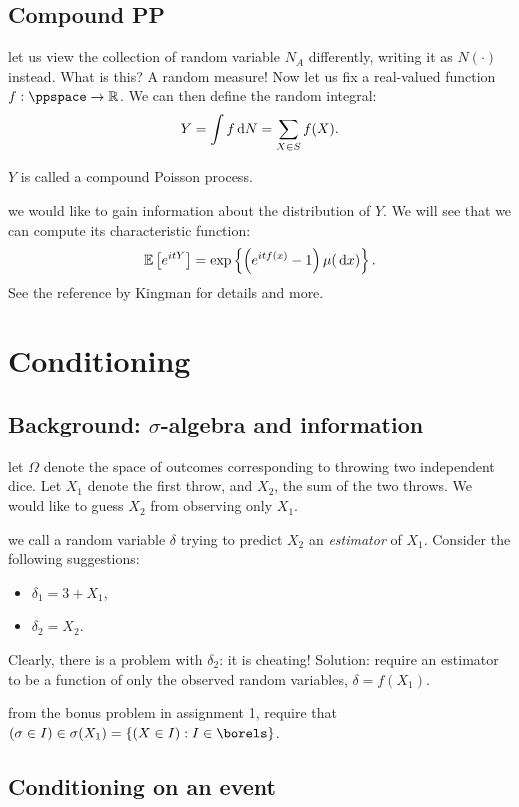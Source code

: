 \documentclass{article}
\begin{document}
\subsection{Compound PP}

 let us view the collection of random variable $N_A$ differently, writing it as $N(\cdot)$ instead. What is this? A random measure! Now let us fix a real-valued function $f : \ppspace \to \R$. We can then define the random integral:
\[ Y = \int f \,\mathrm{d} N = \sum_{X \in S} f(X). \]

 $Y$ is called a compound Poisson process.

 we would like to gain information about the distribution of $Y$. We will see that we can compute its characteristic function:
\[ {\mathbb E}\left[e^{itY}\right] = \exp\left\{ \left(e^{itf(x)} - 1\right) \mu(\,\mathrm{d} x) \right\}. \]
See the reference by Kingman for details and more.


\section{Conditioning}

\subsection{Background: $\sigma$-algebra and information}\label{sec:sigma-algebra-and-information}

 let $\Omega$ denote the space of outcomes corresponding to throwing two independent dice. Let $X_1$ denote the first throw, and $X_2$, the sum of the two throws. We would like to guess $X_2$ from observing only $X_1$.

 we call a random variable $\delta$ trying to predict $X_2$ an \emph{estimator} of $X_1$. Consider the following suggestions:
\begin{itemize}
  \item $\delta_1 = 3 + X_1$,
  \item $\delta_2 = X_2$.
\end{itemize}
Clearly, there is a problem with $\delta_2$: it is cheating! Solution: require an estimator to be a function of only the observed random variables, $\delta = f(X_1)$.

 from the bonus problem in assignment 1, require that $(\sigma \in I) \in \sigma(X_1) = \{(X\in I) : I \in \borels\}$.


\subsection{Conditioning on an event}
\end{document}
